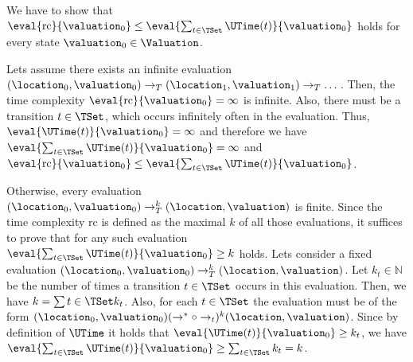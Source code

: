 We have to show that $\eval{\text{rc}}{\valuation_0} \leq \eval{\sum_{t \in \TSet}\UTime(t)}{\valuation_0}$ holds for every state $\valuation_0 \in \Valuation$.

Lets assume there exists an infinite evaluation $(\location_0, \valuation_0) \rightarrow_T (\location_1, \valuation_1) \rightarrow_T \dots$.
Then, the time complexity $\eval{\text{rc}}{\valuation_0} = \infty$ is infinite.
Also, there must be a transition $t \in \TSet$, which occurs infinitely often in the evaluation.
Thus, $\eval{\UTime(t)}{\valuation_0} = \infty$ and therefore we have $\eval{\sum_{t \in \TSet}\UTime(t)}{\valuation_0} = \infty$ and $\eval{\text{rc}}{\valuation_0} \leq \eval{\sum_{t \in \TSet}\UTime(t)}{\valuation_0}$.

Otherwise, every evaluation $(\location_0, \valuation_0) \rightarrow^k_T (\location, \valuation)$ is finite.
Since the time complexity $\text{rc}$ is defined as the maximal $k$ of all those evaluations, it suffices to prove that for any such evaluation $\eval{\sum_{t \in \TSet}\UTime(t)}{\valuation_0} \geq k$ holds.
Lets consider a fixed evaluation $(\location_0, \valuation_0) \rightarrow^k_T (\location, \valuation)$.
Let $k_t \in \mathbb{N}$ be the number of times a transition $t \in \TSet$ occurs in this evaluation.
Then, we have $k = \sum{t \in \TSet} k_t$.
Also, for each $t \in \TSet$ the evaluation must be of the form $(\location_0, \valuation_0) (\rightarrow^* \circ \rightarrow_t)^k (\location, \valuation)$.
Since by definition of $\UTime$ it holds that $\eval{\UTime(t)}{\valuation_0} \geq k_t$, we have $\eval{\sum_{t \in \TSet}\UTime(t)}{\valuation_0} \geq \sum_{t \in \TSet} k_t = k$.
